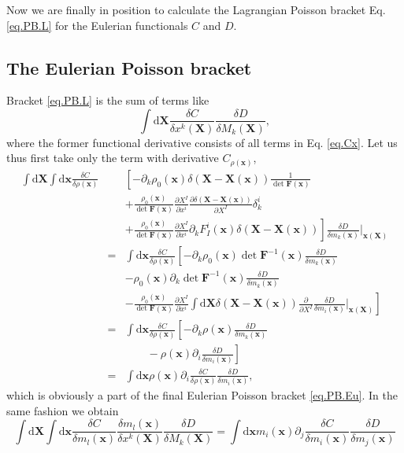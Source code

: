 \documentclass[
10pt, %
a4paper, %
oneside, %
headinclude,footinclude, %
BCOR5mm, %
]{scrartcl}
\newcommand{\xx}{\mathbf{x}}
\newcommand{\XX}{\mathbf{X}}
\newcommand{\dX}{\mathrm{d}\XX}
\newcommand{\dx}{\mathrm{d}\xx}
\newcommand{\FF}{\mathbf{F}}
\begin{document}
Now we are finally in position to calculate the Lagrangian Poisson bracket Eq. \eqref{eq.PB.L} for the Eulerian functionals $C$ and $D$. 

\subsection{The Eulerian Poisson bracket}
Bracket \eqref{eq.PB.L} is the sum of terms like
\begin{equation}
	\int\dX \frac{\delta C}{\delta x^k(\XX)} \frac{\delta D}{\delta M_k(\XX)},
\end{equation}
where the former functional derivative consists of all terms in Eq. \eqref{eq.Cx}. Let us thus first take only the term with derivative $C_{\rho(\xx)}$,
\begin{eqnarray}
	\int\dX \int\dx \frac{\delta C}{\delta \rho(\xx)}&&
	\left[
		-\partial_k \rho_0(\xx) \delta(\XX-\XX(\xx))\frac{1}{\det\FF(\xx)}\right.\nonumber\\
	&&
	+\frac{\rho_0(\xx)}{\det \FF(\xx)} \frac{\partial X^I}{\partial x^i} \frac{\partial \delta(\XX-\XX(\xx))}{\partial X^I}\delta^i_k \nonumber\\
	&&\left.+\frac{\rho_0(\xx)}{\det \FF(\xx)} \frac{\partial X^I}{\partial x^i} \partial_k F^i_I(\xx)\delta(\XX-\XX(\xx))\right]
\frac{\delta D}{\delta m_k(\xx)}\Big|_{\xx(\XX)}\nonumber\\
	&=& \int\dx \frac{\delta C}{\delta \rho(\xx)}\left[
		-\partial_k \rho_0(\xx)\det\FF^{-1}(\xx)\frac{\delta D}{\delta m_k(\xx)} \right.\nonumber\\
		&&-\rho_0(\xx) \partial_k \det \FF^{-1}(\xx)\frac{\delta D}{\delta m_k(\xx)} \nonumber\\
		&&\left.-\frac{\rho_0(\xx)}{\det \FF(\xx)} \frac{\partial X^I}{\partial x^i} \int\dX \delta(\XX-\XX(\xx))\frac{\partial}{\partial X^I}\frac{\delta D}{\delta m_i(\xx)}\Big|_{\xx(\XX)}\right]\nonumber\\
	&=&\int\dx \frac{\delta C}{\delta \rho(\xx)}\left[-\partial_k \rho(\xx)\frac{\delta D}{\delta m_k(\xx)}\right.\nonumber\\
	&&\left.\qquad -\rho(\xx) \partial_i \frac{\delta D}{\delta m_i(\xx)}\right]\nonumber\\
	&=& \int\dx \rho(\xx)\partial_i \frac{\delta C}{\delta \rho(\xx)} \frac{\delta D}{\delta m_i(\xx)},
\end{eqnarray}
which is obviously a part of the final Eulerian Poisson bracket \eqref{eq.PB.Eu}. In the same fashion we obtain
\begin{equation}
	\int\dX \int\dx \frac{\delta C}{\delta m_l(\xx)} \frac{\delta m_l(\xx)}{\delta x^k(\XX)} \frac{\delta D}{\delta M_k(\XX)}
	= \int\dx m_i(\xx)\partial_j \frac{\delta C}{\delta m_i(\xx)} \frac{\delta D}{\delta m_j(\xx)}
\end{equation}
\end{document}
